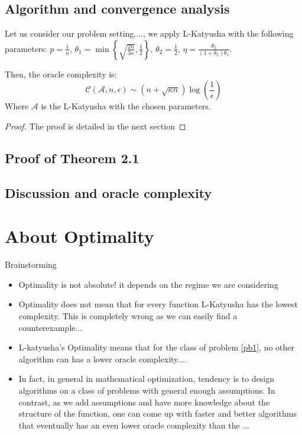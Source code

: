 \documentclass[12pt]{report}
\newcounter{theo}[section]
\newenvironment{theo}[2][]{%
    \refstepcounter{theo}
\newcommand*{\defeq}{\mathrel{\vcenter{\baselineskip0.5ex \lineskiplimit0pt
                     \hbox{\scriptsize.}\hbox{\scriptsize.}}}%
                     =} 
 
\begin{mdframed}[]\relax}{%
\end{mdframed}}
\begin{document}
\section{Algorithm and convergence analysis}




\newpage
\begin{theo}
LLet us consider our problem setting...., we apply L-Katyusha with the following parameters:
$p=\frac{1}{n}$,  $\theta_1=\min\left\{\sqrt{\frac{2n}{3\kappa}},\frac{1}{2}\right\} $, $\theta_2=\frac{1}{2}$, $\eta=\frac{\theta_2}{(1+\theta_2)\theta_1} $.

Then, the oracle complexity is:
$$ \mathcal{C}(\mathcal{A},n,\epsilon)\sim \left(n+\sqrt{\kappa n}\right)\log\left(\frac{1}{\epsilon}\right)$$
Where $\mathcal{A}$ is the L-Katyusha with the chosen parameters.
\end{theo}


\begin{proof}
The proof is detailed in the next section
\end{proof}

\section{Proof of Theorem 2.1}


\section{Discussion and oracle complexity}


\chapter{About Optimality}

Brainstorming
\begin{itemize}
    \item {Optimality is not absolute! it depends on the regime we are considering}
    \item Optimality does not mean that for every function L-Katyusha has the lowest complexity. This is completely wrong as we can easily find a counterexample...
    \item L-katyusha's Optimality means that for the class of problem \ref{pb1}, no other algorithm can has a lower oracle complexity....
    \item In fact, in general in mathematical optimization, tendency is to design algorithms on a class of problems with general enough assumptions. In contrast, as we add assumptions and have more knowledge about the structure of the function, one can come up with faster and better algorithms that eventually has an even lower oracle complexity than the ...
\end{itemize}
\end{document}
